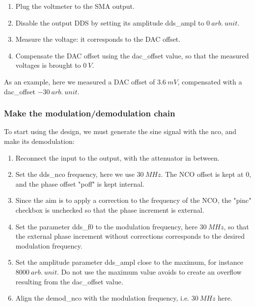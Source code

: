 \documentclass[12pt,oneside]{article}
\begin{document}
\vspace{0.3cm}
\begin{enumerate}
	\setlength\itemsep{-0.1cm}
	\item Plug the voltmeter to the SMA output.
	\item Disable the output DDS by setting its amplitude dds\_ampl to $0~arb.~unit$.
	\item Measure the voltage: it corresponds to the DAC offset.
	\item Compensate the DAC offset using the dac\_offset value, so that the measured voltages is brought to $0~V$.
\end{enumerate}
\vspace{0.3cm}

As an example, here we measured a DAC offset of $3.6~mV$, compensated with a dac\_offset $-30~arb.~unit$.

\subsubsection{Make the modulation/demodulation chain}

To start using the design, we must generate the sine signal with the nco, and make its demodulation:

\vspace{0.3cm}
\begin{enumerate}
	\setlength\itemsep{-0.1cm}
	\item Reconnect the input to the output, with the attenuator in between.
	\item Set the dds\_nco frequency, here we use $30~MHz$. The NCO offset is kept at $0$, and the phase offset "poff" is kept internal.
	\item Since the aim is to apply a correction to the frequency of the NCO, the "pinc" checkbox is unchecked so that the phase increment is external.
	\item Set the parameter dds\_f0 to the modulation frequency, here $30~MHz$, so that the external phase increment without corrections corresponds to the desired modulation frequency. 
	\item Set the amplitude parameter dds\_ampl close to the maximum, for instance $8000~arb.~unit$. Do not use the maximum value avoids to create an overflow resulting from the dac\_offset value. 
	\item Align the demod\_nco with the modulation frequency, i.e. $30~MHz$ here. 
\end{enumerate}
\vspace{0.3cm}
\end{document}
